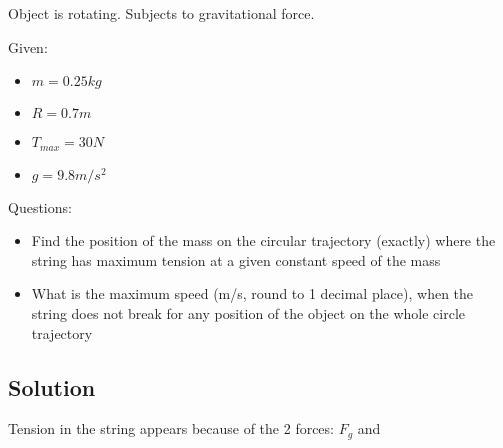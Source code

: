 

Object is rotating. Subjects to gravitational force.


\bigbreak Given: 
\begin{itemize}
    \item $  m  = 0.25kg $
    \item $ R = 0.7m $
    \item $ T_{max} = 30N $
    \item $ g = 9.8m/s^2 $
\end{itemize}


\bigbreak Questions:
\begin{itemize}
    \item Find the position of the mass on the circular trajectory (exactly) where the string has
    maximum tension at a given constant speed of the mass
    \item What is the maximum speed (m/s, round to 1 decimal place), when the string does not
    break for any position of the object on the whole circle trajectory
\end{itemize}

\subsection*{Solution}
Tension in the string appears because of the 2 forces: $F_g$ and $$


